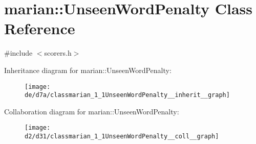 \hypertarget{classmarian_1_1UnseenWordPenalty}{}\section{marian\+:\+:Unseen\+Word\+Penalty Class Reference}
\label{classmarian_1_1UnseenWordPenalty}


{\ttfamily \#include $<$scorers.\+h$>$}



Inheritance diagram for marian\+:\+:Unseen\+Word\+Penalty\+:
\nopagebreak
\begin{figure}[H]
\begin{center}
\leavevmode
\texttt{[image: de/d7a/classmarian\_1\_1UnseenWordPenalty\_\_inherit\_\_graph]}
\end{center}
\end{figure}


Collaboration diagram for marian\+:\+:Unseen\+Word\+Penalty\+:
\nopagebreak
\begin{figure}[H]
\begin{center}
\leavevmode
\texttt{[image: d2/d31/classmarian\_1\_1UnseenWordPenalty\_\_coll\_\_graph]}
\end{center}
\end{figure}
